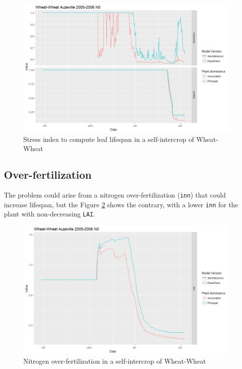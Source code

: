 \documentclass[]{book}
\begin{document}
\begin{figure}
\centering
\includegraphics{img/sen_stress.png}
\caption{\label{fig:senstress}Stress index to compute leaf lifespan in a self-intercrop of Wheat-Wheat}
\end{figure}

\hypertarget{over-fertilization}{%
\subsection{Over-fertilization}\label{over-fertilization}}

The problem could arise from a nitrogen over-fertilization (\texttt{inn}) that could increase lifespan, but the Figure \ref{fig:overfert} shows the contrary, with a lower \texttt{inn} for the plant with non-decreasing \texttt{LAI}.

\begin{figure}
\centering
\includegraphics{img/overfert.png}
\caption{\label{fig:overfert}Nitrogen over-fertilization in a self-intercrop of Wheat-Wheat}
\end{figure}
\end{document}

